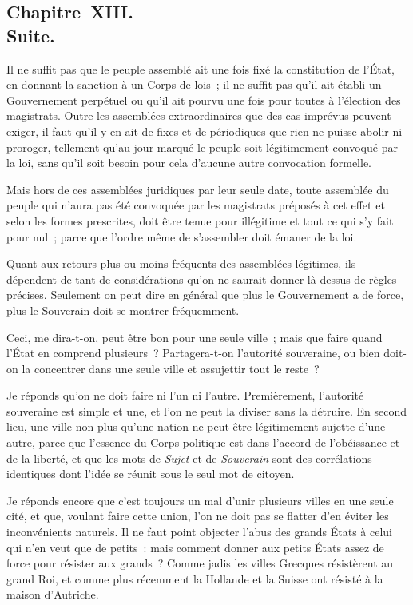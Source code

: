 \documentclass[french,twoside]{book} %
\begin{document}
\subsection[{Chapitre XIII. Suite.}]{Chapitre XIII. \\
Suite.}
\noindent Il ne suffit pas que le peuple assemblé ait une fois fixé la constitution de l’État, en donnant la sanction à un Corps de lois ; il ne suffit pas qu’il ait établi un Gouvernement perpétuel ou qu’il ait pourvu une fois pour toutes à l’élection des magistrats. Outre les assemblées extraordinaires que des cas imprévus peuvent exiger, il faut qu’il y en ait de fixes et de périodiques que rien ne puisse abolir ni proroger, tellement qu’au jour marqué le peuple soit légitimement convoqué par la loi, sans qu’il soit besoin pour cela d’aucune autre convocation formelle.\par
Mais hors de ces assemblées juridiques par leur seule date, toute assemblée du peuple qui n’aura pas été convoquée par les magistrats préposés à cet effet et selon les formes prescrites, doit être tenue pour illégitime et tout ce qui s’y fait pour nul ; parce que l’ordre même de s’assembler doit émaner de la loi.\par
Quant aux retours plus ou moins fréquents des assemblées légitimes, ils dépendent de tant de considérations qu’on ne saurait donner là-dessus de règles précises. Seulement on peut dire en général que plus le Gouvernement a de force, plus le Souverain doit se montrer fréquemment.\par
Ceci, me dira-t-on, peut être bon pour une seule ville ; mais que faire quand l’État en comprend plusieurs ? Partagera-t-on l’autorité souveraine, ou bien doit-on la concentrer dans une seule ville et assujettir tout le reste ?\par
Je réponds qu’on ne doit faire ni l’un ni l’autre. Premièrement, l’autorité souveraine est simple et une, et l’on ne peut la diviser sans la détruire. En second lieu, une ville non plus qu’une nation ne peut être légitimement sujette d’une autre, parce que l’essence du Corps politique est dans l’accord de l’obéissance et de la liberté, et que les mots de {\itshape Sujet} et de {\itshape Souverain} sont des corrélations identiques dont l’idée se réunit sous le seul mot de citoyen.\par
Je réponds encore que c’est toujours un mal d’unir plusieurs villes en une seule cité, et que, voulant faire cette union, l’on ne doit pas se flatter d’en éviter les inconvénients naturels. Il ne faut point objecter l’abus des grands États à celui qui n’en veut que de petits : mais comment donner aux petits États assez de force pour résister aux grands ? Comme jadis les villes Grecques résistèrent au grand Roi, et comme plus récemment la Hollande et la Suisse ont résisté à la maison d’Autriche.\par
\end{document}
